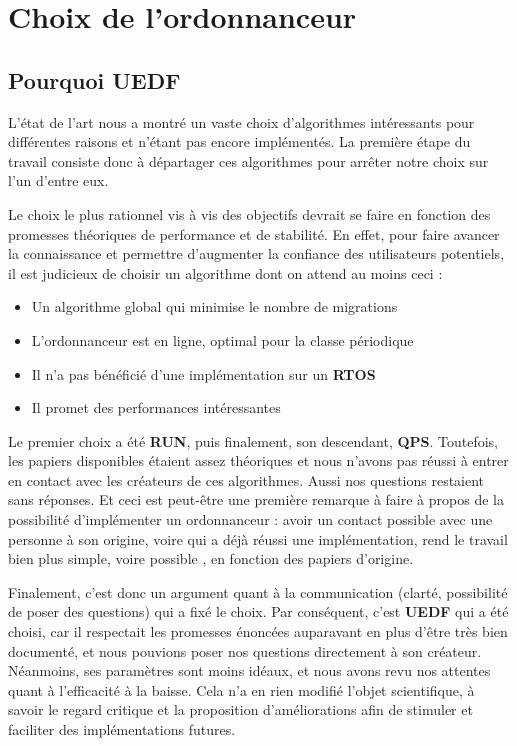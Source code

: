 \section{Choix de l'ordonnanceur}

	\subsection{Pourquoi UEDF}
	
	L'état de l'art nous a montré un vaste choix d'algorithmes intéressants pour différentes 
	raisons et n'étant pas encore implémentés. La première étape du travail consiste donc 
	à départager ces algorithmes pour arrêter notre choix sur l'un d'entre eux.
	
	Le choix le plus rationnel vis à vis des objectifs devrait se faire en fonction des 
	promesses théoriques de performance et de stabilité. 
	En effet, pour faire avancer la connaissance et permettre d'augmenter la confiance des utilisateurs 
	potentiels, il est judicieux de choisir un algorithme dont on attend au moins ceci :
	\begin{itemize}
		\item Un algorithme global qui minimise le nombre de migrations
		\item L'ordonnanceur est en ligne, optimal pour la classe périodique
		\item Il n'a pas bénéficié d'une implémentation sur un \textbf{RTOS}
		\item Il promet des performances intéressantes
	\end{itemize}
	
	Le premier choix a été \textbf{RUN}, puis finalement, son descendant, \textbf{QPS}. 
	Toutefois, les papiers disponibles étaient assez théoriques et nous n'avons pas réussi à 
	entrer en contact avec les créateurs de ces algorithmes. Aussi nos questions restaient sans réponses.
	Et ceci est peut-être une première remarque à faire à propos de la possibilité d'implémenter 
	un ordonnanceur : avoir un contact possible avec une personne à son origine, voire qui a déjà 
	réussi une implémentation, rend le travail bien plus simple, voire possible , en fonction des 
	papiers d'origine.\newline
	
	
	
	Finalement, c'est donc un argument quant à la communication (clarté, possibilité de poser des questions) 
	qui a fixé le choix. Par conséquent, c'est \textbf{UEDF} qui a été choisi, car il respectait 
	les promesses énoncées auparavant en plus d'être très bien documenté, et nous pouvions 
	poser nos questions directement à son créateur. Néanmoins, ses paramètres sont moins idéaux, 
	et nous avons revu nos attentes quant à l'efficacité à la baisse. Cela n'a en rien 
	modifié l'objet scientifique, à savoir le regard critique et la proposition d'améliorations 
	afin de stimuler et faciliter des implémentations futures.\newline
	
